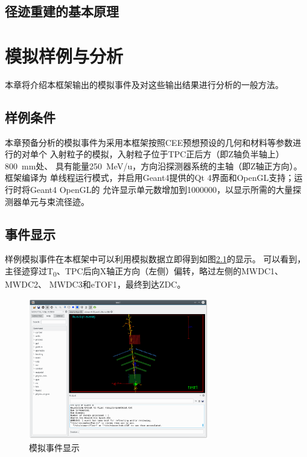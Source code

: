 \documentclass[bachelor,openany,oneside,color]{buaathesis}
\def\TZ{T\textsubscript{0}}
\begin{document}
\section{径迹重建的基本原理}%


\chapter{模拟样例与分析}\label{chap:例子}

本章将介绍本框架输出的模拟事件及对这些输出结果进行分析的一般方法。

\section{样例条件}

本章预备分析的模拟事件为采用本框架按照CEE预想预设的几何和材料等参数进行的对单个
入射粒子的模拟，入射粒子位于TPC正后方（即Z轴负半轴上）\SI{800}{\milli\meter}处、
具有能量\SI{250}{\mega\eV/u}，方向沿探测器系统的主轴（即Z轴正方向）。框架编译为
单线程运行模式，并启用Geant4提供的Qt 4界面和OpenGL支持；运行时将Geant4 OpenGL的
允许显示单元数增加到1000000，以显示所需的大量探测器单元与束流径迹。

\section{事件显示}

样例模拟事件在本框架中可以利用模拟数据立即得到如图\ref{fig:EventDisplay}的显示。
可以看到，主径迹穿过\TZ、TPC后向X轴正方向（左侧）偏转，略过左侧的MWDC1、MWDC2、
MWDC3和eTOF1，最终到达ZDC。

\begin{figure}
	\centering
	\includegraphics[width=0.7\textwidth]{./resource/EventDisplay.png}
	\caption{模拟事件显示}\label{fig:EventDisplay}
\end{figure}
\end{document}

